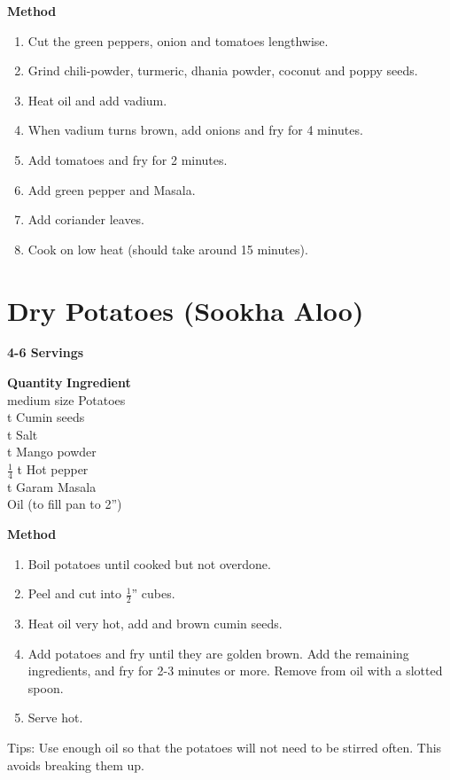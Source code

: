 \vspace*{.25in}
{\bf Method}
\begin{enumerate}
   \item  Cut the green peppers, onion and tomatoes lengthwise.
   \item Grind chili-powder, turmeric, dhania powder, coconut and
poppy seeds.
   \item Heat oil and add vadium.
   \item When vadium turns brown, add onions and fry for 4 minutes.
   \item Add tomatoes and fry for 2 minutes.
   \item Add green pepper and Masala.
   \item Add coriander leaves.
   \item Cook on low heat (should take around 15 minutes).
\end{enumerate}

\section{Dry Potatoes (Sookha Aloo)}
{\bf 4-6 Servings}
\begin{tabbing}
\hspace{1.0cm}  \={\bf Quantity}   \hspace{3.0cm} \={\bf Ingredient}\\
 medium size \>Potatoes\\
 t \>Cumin seeds\\
 t \>Salt\\
 t \>Mango powder\\
\>$\frac{1}{4}$ t\> Hot pepper\\
 t \>Garam Masala\\
\> \>Oil (to fill pan to 2'')\\
\end{tabbing}


{\bf Method}
\begin{enumerate}
\item  Boil potatoes until cooked but not overdone.
\item  Peel and cut into $\frac{1}{2}$'' cubes.
\item  Heat oil very hot, add and brown cumin seeds.
\item  Add potatoes and fry until they are golden brown.  Add the remaining
ingredients, and fry for 2-3 minutes or more.  Remove from oil with a slotted
spoon.
\item  Serve hot.
\end{enumerate}
Tips:  Use enough oil so that the potatoes will not need to be stirred
often.  This avoids breaking them up.

